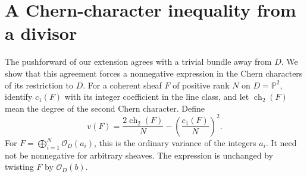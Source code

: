 \documentclass[11pt]{article}
\theoremstyle{remark}
\newcommand{\PP}{\mathbb P}
\newcommand{\cO}{\mathcal O}
\DeclareMathOperator{\ch}{ch}
\begin{document}
\section{A Chern-character inequality from a divisor}\label{sec:lattice}
The pushforward of our extension agrees with a trivial bundle away
from $D$. We show that this agreement forces a nonnegative expression
in the Chern characters of its restriction to $D$.
For a coherent sheaf $F$ of positive rank $N$ on $D=\PP^2$, identify
$c_1(F)$ with its integer coefficient in the line class, and let
$\ch_2(F)$ mean the degree of the second Chern character. Define
\[
 v(F)=\frac{2\ch_2(F)}N-\left(\frac{c_1(F)}N\right)^2.
\]
For $F=\bigoplus_{i=1}^N\cO_D(a_i)$, this is the ordinary variance
of the integers $a_i$. It need not be nonnegative for arbitrary sheaves.
The expression is unchanged by twisting $F$ by $\cO_D(b)$.
\end{document}
